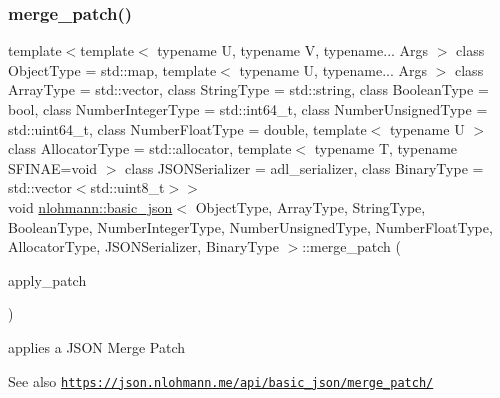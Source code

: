 \subsubsection{\texorpdfstring{merge\+\_\+patch()}{merge\_patch()}}
{\footnotesize\ttfamily template$<$template$<$ typename U, typename V, typename... Args $>$ class Object\+Type = std\+::map, template$<$ typename U, typename... Args $>$ class Array\+Type = std\+::vector, class String\+Type  = std\+::string, class Boolean\+Type  = bool, class Number\+Integer\+Type  = std\+::int64\+\_\+t, class Number\+Unsigned\+Type  = std\+::uint64\+\_\+t, class Number\+Float\+Type  = double, template$<$ typename U $>$ class Allocator\+Type = std\+::allocator, template$<$ typename T, typename S\+F\+I\+N\+A\+E=void $>$ class J\+S\+O\+N\+Serializer = adl\+\_\+serializer, class Binary\+Type  = std\+::vector$<$std\+::uint8\+\_\+t$>$$>$ \\
void \hyperlink{classnlohmann_1_1basic__json}{nlohmann\+::basic\+\_\+json}$<$ Object\+Type, Array\+Type, String\+Type, Boolean\+Type, Number\+Integer\+Type, Number\+Unsigned\+Type, Number\+Float\+Type, Allocator\+Type, J\+S\+O\+N\+Serializer, Binary\+Type $>$\+::merge\+\_\+patch (\begin{DoxyParamCaption}\item[{const \hyperlink{classnlohmann_1_1basic__json}{basic\+\_\+json}$<$ Object\+Type, Array\+Type, String\+Type, Boolean\+Type, Number\+Integer\+Type, Number\+Unsigned\+Type, Number\+Float\+Type, Allocator\+Type, J\+S\+O\+N\+Serializer, Binary\+Type $>$ \&}]{apply\+\_\+patch }\end{DoxyParamCaption})\hspace{0.3cm}{\ttfamily [inline]}}



applies a J\+S\+ON Merge Patch 

\begin{DoxySeeAlso}{See also}
\href{https://json.nlohmann.me/api/basic_json/merge_patch/}{\tt https\+://json.\+nlohmann.\+me/api/basic\+\_\+json/merge\+\_\+patch/} 
\end{DoxySeeAlso}
\mbox{\label{classnlohmann_1_1basic__json_a351b4f65014f6c2b8b2832847d44bbd7}} 
